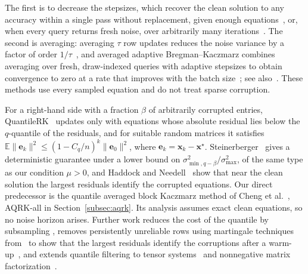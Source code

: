 \documentclass[pdflatex,sn-mathphys-num]{sn-jnl}
\theoremstyle{thmstyleone}
\theoremstyle{thmstylethree}
\newcommand{\vx}{\mathbf{x}}
\newcommand{\ve}{\mathbf{e}}
\begin{document}
The first is to decrease the stepsizes, which recover the clean solution to
any accuracy within a single pass without replacement, given enough
equations~\cite{marshall2022optimal}, or, when every query returns fresh noise,
over arbitrarily many iterations~\cite{tondji2023adaptive}. The second is
averaging: averaging $\tau$ row updates reduces the noise variance by a factor
of order $1/\tau$~\cite{moorman2021randomized}, and averaged adaptive
Bregman--Kaczmarz combines averaging over fresh, draw-indexed queries with
adaptive stepsizes to obtain convergence to zero at a rate that improves with
the batch size~\cite{tondji2026accelerated}; see
also~\cite{lin2015learning,2025tailaveraging,zhang2026signal}. These methods
use every sampled equation and do not treat sparse corruption.

For a right-hand side with a fraction $\beta$ of arbitrarily corrupted
entries, QuantileRK~\cite{haddock2022quantilebased} updates only with
equations whose absolute residual lies below the $q$-quantile of the
residuals, and for suitable random matrices it satisfies
$\mathbb E\|\ve_k\|^2\le(1-C_q/n)^k\|\ve_0\|^2$, where
$\ve_k=\vx_k-\vx^\star$. Steinerberger~\cite{steinerberger2021quantile}
gives a deterministic guarantee under a lower bound on
$\sigma_{\min,q-\beta}^2/\sigma_{\max}^2$, of the same type as our
condition $\mu>0$, and Haddock and Needell~\cite{haddock2019randomized} show
that near the clean solution the largest residuals identify the corrupted
equations. Our direct predecessor is the quantile averaged block Kaczmarz
method of Cheng et al.~\cite{cheng2022block}, AQRK-all in
Section~\ref{subsec:aqrk}. Its analysis assumes exact clean equations, so no
noise horizon arises. Further work reduces the cost of the quantile by
subsampling \cite{haddock2023subsampled}, removes persistently
unreliable rows using martingale techniques from~\cite{anderson2025beyond}
to show that the largest residuals identify the corruptions after a
warm-up~\cite{shvaiko2026whitelist}, and extends quantile filtering to tensor
systems~\cite{castillo2025tensor} and nonnegative matrix
factorization~\cite{collins2025quantile}.
\end{document}
